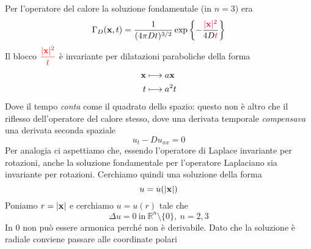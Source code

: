 Per l'operatore del calore la soluzione fondamentale (in $n=3$) era
\begin{equation*}
    \Gamma _{D}(\x,t) =\frac{1}{(4\pi Dt)^{3/2}}\exp\left\{-\frac{\textcolor[rgb]{0.82,0.01,0.11}{|\x|^{2}}}{4D\textcolor[rgb]{0.82,0.01,0.11}{t}}\right\}
\end{equation*}
Il blocco $\displaystyle \textcolor[rgb]{1,0,0}{\frac{|\x|^{2}}{t}}$ è invariante per dilatazioni paraboliche della forma
\begin{align*}
    \mathbf{x} & \longmapsto a\mathbf{x}     \\
    t  & \longmapsto a^{2} t
\end{align*}
Dove il tempo \textit{conta} come il quadrato dello spazio: questo non è altro che il riflesso dell'operatore del calore stesso, dove una derivata temporale \textit{compensava} una derivata seconda spaziale
\begin{equation*}
    u_{t} -Du_{xx} =0
\end{equation*}
Per analogia ci aspettiamo che, essendo l'operatore di Laplace invariante per rotazioni, anche la soluzione fondamentale per l'operatore Laplaciano sia invariante per rotazioni. Cerchiamo quindi una soluzione della forma
\begin{equation*}
    u=u(|\mathbf{x}|)
\end{equation*}
Poniamo $\displaystyle r=|\mathbf{x}| $ e cerchiamo $\displaystyle u=u(r)$ tale che
\begin{equation*}
    \Delta u=0\ \text{in} \ \mathbb{R}^{n} \setminus \{0\},\ n=2,3
\end{equation*}
In $0$ non può essere armonica perché non è derivabile. Dato che la soluzione è radiale conviene passare alle coordinate polari
